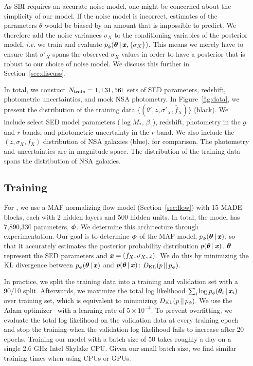 As SBI requires an accurate noise model, one might be concerned about the
simplicity of our model.
If the noise model is incorrect, estimates of the parameters $\theta$ would be
biased by an amount that is impossible to predict.
We therefore add the noise variances $\sigma_X$ to the conditioning variables
of the posterior model, \emph{i.e.} we train and evaluate 
$p_\phi(\boldsymbol{\theta}\,|\,\textbf{\textit{x}},\{\sigma_X\})$.
This means we merely have to ensure that $\sigma'_X$ spans the observed
$\sigma_X$ values in order to have a posterior that is robust to our choice of
noise model.
We discuss this further in Section~\ref{sec:discuss}.

In total, we constuct $N_{\rm train} = 1,131,561$ sets of SED parameters,
redshift, photometric uncertainties, and mock NSA photometry. 
In Figure~\ref{fig:data}, we present the distribution of the training data
$\{(\theta', z, \sigma'_X, \hat{f}_X) \}$ (black).
We include select SED model parameters ($\log M_*$, $\beta_1$), redshift,
photometry in the $g$ and $r$ bands, and photometric uncertainty in the $r$
band.
We also include the $(z, \sigma_X, f_X)$ distribution of NSA galaxies (blue),
for comparison.
The photometry and uncertainties are in magnitude-space. 
The distribution of the training data spans the distribution of NSA galaxies.

\subsection{Training \sedflow} \label{sec:anpe_train}
For \sedflow, we use a MAF normalizing flow model (Section~\ref{sec:flow}) with 
15 MADE blocks, each with 2 hidden layers and 500 hidden units.
In total, the model has 7,890,330 parameters, $\boldsymbol{\phi}$. 
We determine this architecture through experimentation. 
Our goal is to determine $\boldsymbol{\phi}$ of the MAF model, 
$p_\phi(\boldsymbol{\theta}\,|\,\textbf{\textit{x}})$, so that it accurately estimates the
posterior probability distribution $p(\boldsymbol{\theta}\,|\,\textbf{\textit{x}})$. 
$\boldsymbol{\theta}$ represent the SED parameters and $\textbf{\textit{x}} = (f_X, \sigma_X, z)$.
We do this by minimizing the KL divergence between 
$p_\phi(\boldsymbol{\theta}\,|\,\textbf{\textit{x}})$ and $p(\boldsymbol{\theta}\,|\,\textbf{\textit{x}})$: 
$D_{\rm KL} (p\,||\,p_\phi)$.

In practice, we split the training data into a training and validation set with
a 90/10 split. 
Afterwards, we maximize the total log likelihood 
$\sum_i \log p_\phi(\boldsymbol{\theta}_i\,|\, \textbf{\textit{x}}_i)$ over training set, which is
equivalent to minimizing $D_{\rm KL} (p\,||\,p_\phi)$.
We use the {\sc Adam} optimizer~\citep{kingma2017} with a learning rate of $5\times10^{-4}$. 
To prevent overfitting, we evaluate the total log likelihood on the validation
data at every training epoch and stop the training when the validation log
likelihood fails to increase after 20 epochs.  
Training our model with a batch size of 50 takes roughly a day on a single 2.6
GHz Intel Skylake CPU. 
Given our small batch size, we find similar training times when using CPUs or
GPUs. 
